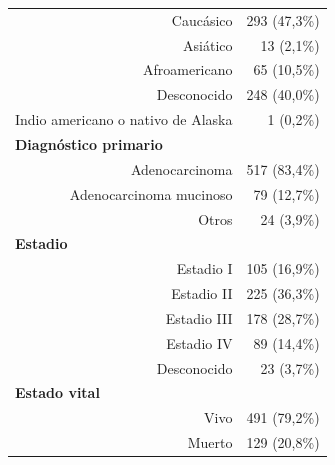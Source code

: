 \begin{table}[H]
\begin{tabular}{rr}
		Caucásico                                         & 293 (47,3\%)                                              \\
		Asiático                                          & 13 (2,1\%)                                                \\
		Afroamericano                                     & 65 (10,5\%)                                               \\
		Desconocido                                       & 248 (40,0\%)                                                \\
		Indio americano o nativo de Alaska                & 1 (0,2\%)                                                 \\ \hline
		\multicolumn{1}{l}{\textbf{Diagnóstico primario}} & \multicolumn{1}{l}{}                                      \\
		Adenocarcinoma                                    & 517 (83,4\%)                                              \\
		Adenocarcinoma mucinoso                           & 79 (12,7\%)                                               \\
		Otros                                             & 24 (3,9\%)                                                \\ \hline
		\multicolumn{1}{l}{\textbf{Estadio}}              &                                                           \\
		Estadio I                                         & 105 (16,9\%)                                              \\
		Estadio II                                        & 225 (36,3\%)                                              \\
		Estadio III                                       & 178 (28,7\%)                                              \\
		Estadio IV                                        & 89 (14,4\%)                                               \\
		Desconocido                                       & 23 (3,7\%)                                                \\ \hline
		\multicolumn{1}{l}{\textbf{Estado vital}}         &                                                           \\
		Vivo                                              & 491 (79,2\%)                                              \\
		Muerto                                            & 129 (20,8\%)                                              \\ \hline
	\end{tabular}
\end{table}


